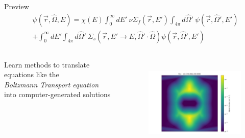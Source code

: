 \documentclass[xcolor=x11names,compress]{beamer}
\renewcommand{\(}{\begin{columns}}
\renewcommand{\)}{\end{columns}}
\newcommand{\<}[1]{\begin{column}{#1}}
\renewcommand{\>}{\end{column}}
\newcommand{\Macro}{\ensuremath{\Sigma}}
\newcommand{\vOmega}{\ensuremath{\hat{\Omega}}}
\begin{document}

\begin{frame}{Preview}
\begin{align}
  [\vOmega \cdot \nabla + \Macro(\vec{r}, E)] &\psi(\vec{r}, \vOmega, E)  = \chi(E) \int_0^{\infty} dE' \:\nu \Macro_{f}(\vec{r}, E') \int_{4\pi} d\vOmega' \:\psi(\vec{r}, \vOmega', E')  \nonumber \\
   &+ \int_0^{\infty} dE' \int_{4\pi} d\vOmega' \:\Macro_{s}(\vec{r}, E' \to E, \vOmega' \cdot \vOmega) \psi(\vec{r}, \vOmega', E')  \nonumber
\end{align}
\vspace{-2em}
\begin{columns}
  \begin{column}{0.5\textwidth}
    Learn methods to translate equations like the \\\emph{Boltzmann Transport equation} \\into computer-generated solutions
  \end{column}
  \begin{column}{0.5\textwidth}
    \begin{figure}
    \includegraphics[height=1.75in,clip]{../figs/WattsBarFlux}
    \end{figure}
  \end{column}
\end{columns}
\end{frame}
\end{document}
